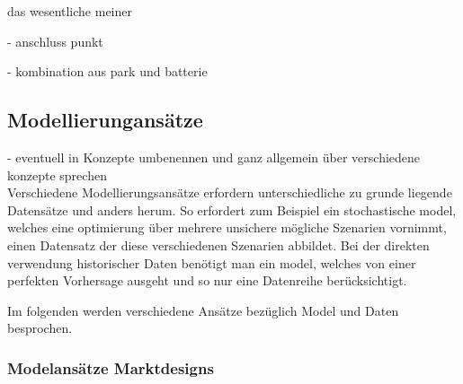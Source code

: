 das wesentliche meiner

- anschluss punkt

- kombination aus park und batterie

\subsection{Modellierungansätze}
- eventuell in Konzepte umbenennen und ganz allgemein über verschiedene konzepte sprechen\\

Verschiedene Modellierungsansätze erfordern unterschiedliche zu grunde liegende Datensätze und anders herum.
So erfordert zum Beispiel ein stochastische model, welches eine optimierung über mehrere unsichere mögliche Szenarien vornimmt,
einen Datensatz der diese verschiedenen Szenarien abbildet. Bei der direkten verwendung historischer Daten benötigt man ein model,
welches  von einer perfekten Vorhersage ausgeht und so nur eine Datenreihe berücksichtigt.

Im folgenden werden verschiedene Ansätze bezüglich Model und Daten besprochen.

\subsubsection{Modelansätze Marktdesigns}

